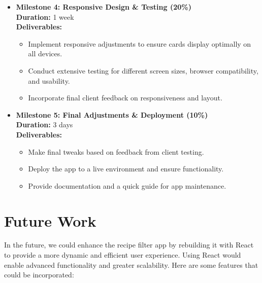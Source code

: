 \documentclass{article}
\begin{document}
\begin{itemize}
    \item \textbf{Milestone 4: Responsive Design \& Testing (20\%)} \\
    \textbf{Duration:} 1 week \\
    \textbf{Deliverables:}
    \begin{itemize}
        \item Implement responsive adjustments to ensure cards display optimally on all devices.
        \item Conduct extensive testing for different screen sizes, browser compatibility, and usability.
        \item Incorporate final client feedback on responsiveness and layout.
    \end{itemize}

    \item \textbf{Milestone 5: Final Adjustments \& Deployment (10\%)} \\
    \textbf{Duration:} 3 days \\
    \textbf{Deliverables:}
    \begin{itemize}
        \item Make final tweaks based on feedback from client testing.
        \item Deploy the app to a live environment and ensure functionality.
        \item Provide documentation and a quick guide for app maintenance.
    \end{itemize}
\end{itemize}

\section*{Future Work}

In the future, we could enhance the recipe filter app by rebuilding it with React to provide a more dynamic and efficient user experience. Using React would enable advanced functionality and greater scalability. Here are some features that could be incorporated:
\end{document}
